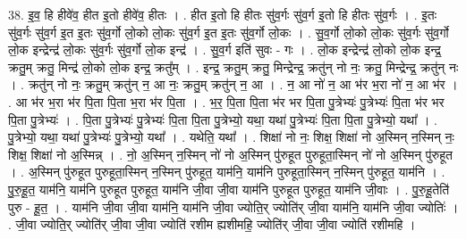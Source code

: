 \documentclass[17pt]{extarticle}
\begin{document}
38. इ॒व॒ हि हीवे॑व॒ हीत इ॒तो हीवे॑व॒ हीतः । . हीत इ॒तो हि हीतः सु॑व॒र्गः सु॑व॒र्ग इ॒तो हि हीतः सु॑व॒र्गः । . इ॒तः सु॑व॒र्गः सु॑व॒र्ग इ॒त इ॒तः सु॑व॒र्गो लो॒को लो॒कः सु॑व॒र्ग इ॒त इ॒तः सु॑व॒र्गो लो॒कः । . सु॒व॒र्गो लो॒को लो॒कः सु॑व॒र्गः सु॑व॒र्गो लो॒क इन्द्रेन्द्र॑ लो॒कः सु॑व॒र्गः सु॑व॒र्गो लो॒क इन्द्र॑ । . सु॒व॒र्ग इति॑ सुवः - गः । . लो॒क इन्द्रेन्द्र॑ लो॒को लो॒क इन्द्र॒ क्रतु॒म् क्रतु॒ मिन्द्र॑ लो॒को लो॒क इन्द्र॒ क्रतु᳚म् । . इन्द्र॒ क्रतु॒म् क्रतु॒ मिन्द्रेन्द्र॒ क्रतु॑न् नो नः॒ क्रतु॒ मिन्द्रेन्द्र॒ क्रतु॑न् नः । . क्रतु॑न् नो नः॒ क्रतु॒म् क्रतु॑न् न॒ आ नः॒ क्रतु॒म् क्रतु॑न् न॒ आ । . न॒ आ नो॑ न॒ आ भ॑र भ॒रा नो॑ न॒ आ भ॑र । . आ भ॑र भ॒रा भ॑र पि॒ता पि॒ता भ॒रा भ॑र पि॒ता । . भ॒र॒ पि॒ता पि॒ता भ॑र भर पि॒ता पु॒त्रेभ्यः॑ पु॒त्रेभ्यः॑ पि॒ता भ॑र भर पि॒ता पु॒त्रेभ्यः॑ । . पि॒ता पु॒त्रेभ्यः॑ पु॒त्रेभ्यः॑ पि॒ता पि॒ता पु॒त्रेभ्यो॒ यथा॒ यथा॑ पु॒त्रेभ्यः॑ पि॒ता पि॒ता पु॒त्रेभ्यो॒ यथा᳚ । . पु॒त्रेभ्यो॒ यथा॒ यथा॑ पु॒त्रेभ्यः॑ पु॒त्रेभ्यो॒ यथा᳚ । . यथेति॒ यथा᳚ । . शिक्षा॑ नो नः॒ शिक्ष॒ शिक्षा॑ नो अ॒स्मिन् न॒स्मिन् नः॒ शिक्ष॒ शिक्षा॑ नो अ॒स्मिन्न् । . नो॒ अ॒स्मिन् न॒स्मिन् नो॑ नो अ॒स्मिन् पु॑रुहूत पुरुहूता॒स्मिन् नो॑ नो अ॒स्मिन् पु॑रुहूत । . अ॒स्मिन् पु॑रुहूत पुरुहूता॒स्मिन् न॒स्मिन् पु॑रुहूत॒ याम॑नि॒ याम॑नि पुरुहूता॒स्मिन् न॒स्मिन् पु॑रुहूत॒ याम॑नि । . पु॒रु॒हू॒त॒ याम॑नि॒ याम॑नि पुरुहूत पुरुहूत॒ याम॑नि जी॒वा जी॒वा याम॑नि पुरुहूत पुरुहूत॒ याम॑नि जी॒वाः । . पु॒रु॒हू॒तेति॑ पुरु - हू॒त॒ । . याम॑नि जी॒वा जी॒वा याम॑नि॒ याम॑नि जी॒वा ज्योति॒र् ज्योति॑र् जी॒वा याम॑नि॒ याम॑नि जी॒वा ज्योतिः॑ । . जी॒वा ज्योति॒र् ज्योति॑र् जी॒वा जी॒वा ज्योति॑ रशीम ह्यशीमहि॒ ज्योति॑र् जी॒वा जी॒वा ज्योति॑ रशीमहि । \newline
\end{document}
